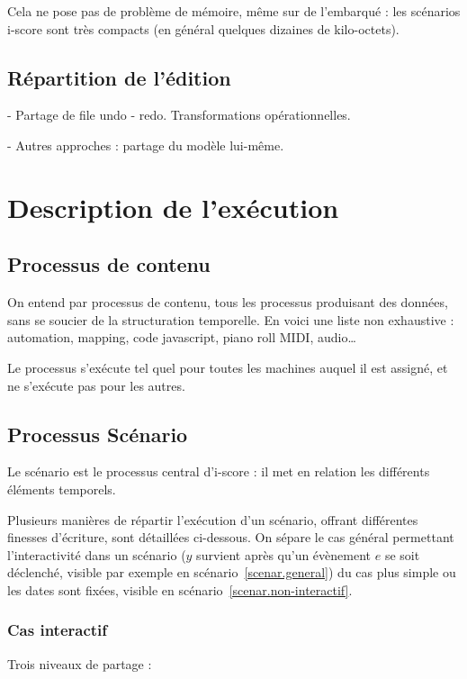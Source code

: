 \documentclass{article}
\begin{document}
Cela ne pose pas de problème de mémoire, même sur de l'embarqué : 
les scénarios i-score sont très compacts (en général quelques dizaines de kilo-octets).

\subsection{Répartition de l'édition}
- Partage de file undo - redo. Transformations opérationnelles. %

- Autres approches : partage du modèle lui-même.

\section{Description de l'exécution}\label{sec.description}
\subsection{Processus de contenu}
On entend par processus de contenu, tous les processus produisant des données, sans se soucier de la structuration temporelle. En voici une liste non exhaustive : automation, mapping, code javascript, piano roll MIDI, audio\dots

Le processus s'exécute tel quel pour toutes les machines auquel il est assigné, 
et ne s'exécute pas pour les autres.


\subsection{Processus Scénario}
Le scénario est le processus central d'i-score : il met en relation les différents éléments temporels.

Plusieurs manières de répartir l'exécution d'un scénario, offrant différentes finesses d'écriture, sont détaillées ci-dessous. On sépare le cas général permettant l'interactivité dans un scénario ($y$ survient après qu'un évènement $e$ se soit déclenché, visible par exemple en scénario~\ref{scenar.general}) du cas plus simple ou les dates sont fixées, visible en scénario~\ref{scenar.non-interactif}.

\subsubsection{Cas interactif}
Trois niveaux de partage : 
\end{document}
